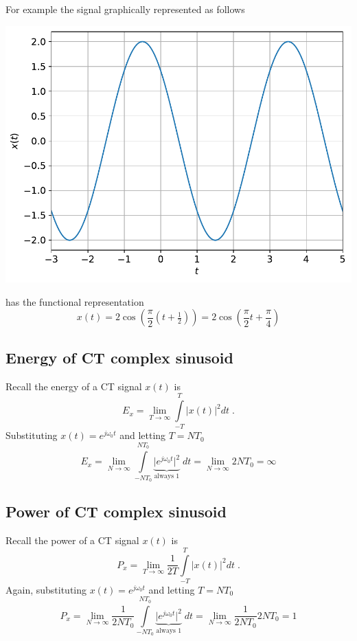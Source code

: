 For example the signal graphically represented as follows
\begin{center}
  \includegraphics[scale=0.6]{graphics/ctsinusoid.pdf}
\end{center}
has the functional representation
\[
x(t) = 2\cos\left(\frac{\pi}{2} (t+\tfrac{1}{2}) \right) =  2\cos\left(\frac{\pi}{2} t +\frac{\pi}{4} \right)
\]

\subsection{Energy of CT complex sinusoid}

Recall the energy of a CT signal $x(t)$ is    
\[
  E_x = \lim_{T\rightarrow\infty} \int\limits_{-T}^T \lvert x(t) \rvert^2 dt \; .
\]
Substituting $x(t) = e^{j\omega_0 t}$ and letting $T = N T_0$
  \[
    E_x = \lim_{N\rightarrow\infty} \int\limits_{-N T_0}^{N T_0} \underbrace{\lvert e^{j\omega_0 t} \rvert^2}_{\text{always 1}} \; dt = \lim_{N\rightarrow\infty} 2NT_0 = \infty
  \]

\subsection{Power of CT complex sinusoid}

Recall the power of a CT signal $x(t)$ is
\[
  P_x = \lim_{T\rightarrow\infty} \frac{1}{2T} \int\limits_{-T}^T \lvert x(t) \rvert^2 dt \; .
\]
Again, substituting $x(t) = e^{j\omega_0 t}$ and letting $T = N T_0$
\[
  P_x = \lim_{N\rightarrow\infty} \frac{1}{2NT_0} \int\limits_{-N T_0}^{N T_0} \underbrace{\lvert e^{j\omega_0 t} \rvert^2}_{\text{always 1}} \; dt = \lim_{N\rightarrow\infty} \frac{1}{2NT_0} 2NT_0 = 1
\]
  
